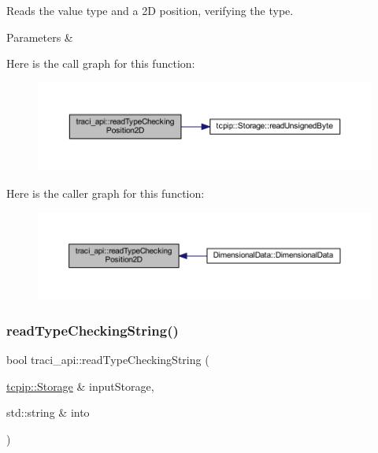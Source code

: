 Reads the value type and a 2D position, verifying the type. 


\begin{DoxyParams}{Parameters}
{\em } & \\
\hline
\end{DoxyParams}
Here is the call graph for this function\+:\nopagebreak
\begin{figure}[H]
\begin{center}
\leavevmode
\includegraphics[width=350pt]{namespacetraci__api_a26421201e19b2667e198708c2216ca06_cgraph}
\end{center}
\end{figure}
Here is the caller graph for this function\+:\nopagebreak
\begin{figure}[H]
\begin{center}
\leavevmode
\includegraphics[width=350pt]{namespacetraci__api_a26421201e19b2667e198708c2216ca06_icgraph}
\end{center}
\end{figure}
\mbox{\label{namespacetraci__api_ac51a66efdbed4dcdcef596643fe387ec}} 
\subsubsection{\texorpdfstring{read\+Type\+Checking\+String()}{readTypeCheckingString()}}
{\footnotesize\ttfamily bool traci\+\_\+api\+::read\+Type\+Checking\+String (\begin{DoxyParamCaption}\item[{\hyperlink{classtcpip_1_1_storage}{tcpip\+::\+Storage} \&}]{input\+Storage,  }\item[{std\+::string \&}]{into }\end{DoxyParamCaption})}




